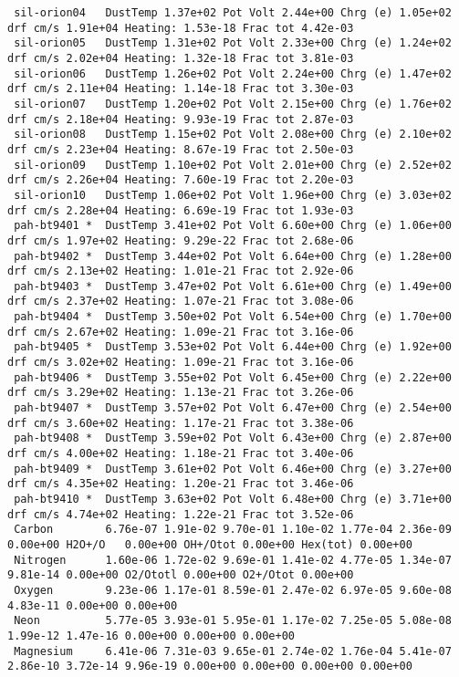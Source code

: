 {\begin{verbatim}
 sil-orion04   DustTemp 1.37e+02 Pot Volt 2.44e+00 Chrg (e) 1.05e+02 drf cm/s 1.91e+04 Heating: 1.53e-18 Frac tot 4.42e-03
 sil-orion05   DustTemp 1.31e+02 Pot Volt 2.33e+00 Chrg (e) 1.24e+02 drf cm/s 2.02e+04 Heating: 1.32e-18 Frac tot 3.81e-03
 sil-orion06   DustTemp 1.26e+02 Pot Volt 2.24e+00 Chrg (e) 1.47e+02 drf cm/s 2.11e+04 Heating: 1.14e-18 Frac tot 3.30e-03
 sil-orion07   DustTemp 1.20e+02 Pot Volt 2.15e+00 Chrg (e) 1.76e+02 drf cm/s 2.18e+04 Heating: 9.93e-19 Frac tot 2.87e-03
 sil-orion08   DustTemp 1.15e+02 Pot Volt 2.08e+00 Chrg (e) 2.10e+02 drf cm/s 2.23e+04 Heating: 8.67e-19 Frac tot 2.50e-03
 sil-orion09   DustTemp 1.10e+02 Pot Volt 2.01e+00 Chrg (e) 2.52e+02 drf cm/s 2.26e+04 Heating: 7.60e-19 Frac tot 2.20e-03
 sil-orion10   DustTemp 1.06e+02 Pot Volt 1.96e+00 Chrg (e) 3.03e+02 drf cm/s 2.28e+04 Heating: 6.69e-19 Frac tot 1.93e-03
 pah-bt9401 *  DustTemp 3.41e+02 Pot Volt 6.60e+00 Chrg (e) 1.06e+00 drf cm/s 1.97e+02 Heating: 9.29e-22 Frac tot 2.68e-06
 pah-bt9402 *  DustTemp 3.44e+02 Pot Volt 6.64e+00 Chrg (e) 1.28e+00 drf cm/s 2.13e+02 Heating: 1.01e-21 Frac tot 2.92e-06
 pah-bt9403 *  DustTemp 3.47e+02 Pot Volt 6.61e+00 Chrg (e) 1.49e+00 drf cm/s 2.37e+02 Heating: 1.07e-21 Frac tot 3.08e-06
 pah-bt9404 *  DustTemp 3.50e+02 Pot Volt 6.54e+00 Chrg (e) 1.70e+00 drf cm/s 2.67e+02 Heating: 1.09e-21 Frac tot 3.16e-06
 pah-bt9405 *  DustTemp 3.53e+02 Pot Volt 6.44e+00 Chrg (e) 1.92e+00 drf cm/s 3.02e+02 Heating: 1.09e-21 Frac tot 3.16e-06
 pah-bt9406 *  DustTemp 3.55e+02 Pot Volt 6.45e+00 Chrg (e) 2.22e+00 drf cm/s 3.29e+02 Heating: 1.13e-21 Frac tot 3.26e-06
 pah-bt9407 *  DustTemp 3.57e+02 Pot Volt 6.47e+00 Chrg (e) 2.54e+00 drf cm/s 3.60e+02 Heating: 1.17e-21 Frac tot 3.38e-06
 pah-bt9408 *  DustTemp 3.59e+02 Pot Volt 6.43e+00 Chrg (e) 2.87e+00 drf cm/s 4.00e+02 Heating: 1.18e-21 Frac tot 3.40e-06
 pah-bt9409 *  DustTemp 3.61e+02 Pot Volt 6.46e+00 Chrg (e) 3.27e+00 drf cm/s 4.35e+02 Heating: 1.20e-21 Frac tot 3.46e-06
 pah-bt9410 *  DustTemp 3.63e+02 Pot Volt 6.48e+00 Chrg (e) 3.71e+00 drf cm/s 4.74e+02 Heating: 1.22e-21 Frac tot 3.52e-06
 Carbon        6.76e-07 1.91e-02 9.70e-01 1.10e-02 1.77e-04 2.36e-09 0.00e+00 H2O+/O   0.00e+00 OH+/Otot 0.00e+00 Hex(tot) 0.00e+00
 Nitrogen      1.60e-06 1.72e-02 9.69e-01 1.41e-02 4.77e-05 1.34e-07 9.81e-14 0.00e+00 O2/Ototl 0.00e+00 O2+/Otot 0.00e+00
 Oxygen        9.23e-06 1.17e-01 8.59e-01 2.47e-02 6.97e-05 9.60e-08 4.83e-11 0.00e+00 0.00e+00
 Neon          5.77e-05 3.93e-01 5.95e-01 1.17e-02 7.25e-05 5.08e-08 1.99e-12 1.47e-16 0.00e+00 0.00e+00 0.00e+00
 Magnesium     6.41e-06 7.31e-03 9.65e-01 2.74e-02 1.76e-04 5.41e-07 2.86e-10 3.72e-14 9.96e-19 0.00e+00 0.00e+00 0.00e+00 0.00e+00

\end{verbatim}}
